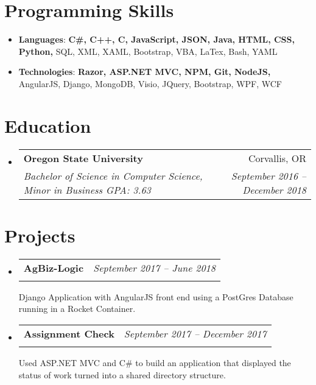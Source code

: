 \documentclass[letterpaper,11pt]{article}
\makeatletter
\newcommand{\resumeSubheading}[4]{
  \vspace{-1pt}\item
    \begin{tabular*}{0.97\textwidth}{l@{\extracolsep{\fill}}r}
      \textbf{\Large#1} & #2 \\
      \textit{\small#3} & \textit{\small #4} \\
    \end{tabular*}\vspace{-5pt}
}
\newcommand{\resumeSubHeadingListStart}{\begin{itemize}[label={},leftmargin=*]}
\newcommand{\resumeSubHeadingListEnd}{\end{itemize}}
\makeatother
\begin{document}
  
\section{Programming Skills}
  \resumeSubHeadingListStart
    \item{
     \textbf{Languages}{: \textbf{C\#, C++, C, JavaScript, JSON, Java, HTML, CSS, Python,} SQL, XML, XAML, Bootstrap, VBA, LaTex, Bash, YAML}}
     \item{
      \textbf{Technologies}{: \textbf{Razor, ASP.NET MVC, NPM, Git, NodeJS,} AngularJS, Django, MongoDB, Visio, JQuery, Bootstrap, WPF, WCF}
    }
  \resumeSubHeadingListEnd

\section{Education}
  \resumeSubHeadingListStart
    \resumeSubheading
      {Oregon State University}{Corvallis, OR}
      {Bachelor of Science in Computer Science, Minor in Business  GPA: 3.63}{September 2016 -- December 2018}
  \resumeSubHeadingListEnd

\section{Projects}
  \resumeSubHeadingListStart
    \resumeSubheading
    {AgBiz-Logic}{\textit{September 2017 -- June 2018}}
    {}{}
        Django Application with AngularJS front end using a PostGres Database running in a Rocket Container.\newline \hfill
    
    \resumeSubheading
    {Assignment Check}{\textit{September 2017 -- December 2017}}{}{}
        Used ASP.NET MVC and C\# to build an application that displayed the status of work turned into a shared directory structure.\\
  \resumeSubHeadingListEnd
\end{document}
